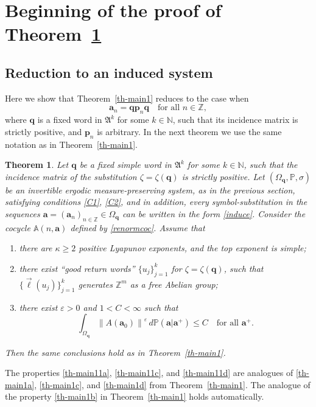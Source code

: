 \documentclass[10pt]{amsart}
\theoremstyle{plain}
\newtheorem{theorem}{Theorem}[section]
\theoremstyle{definition}
\newcommand\bom{{\boldsymbol a}}\let\ba\bom
\newcommand\bp{{\boldsymbol p}}
\newcommand\bq{{\boldsymbol q}}
\let\eps\varepsilon
\let\Om\Omega
\let\sig\sigma
\newcommand\FrA{\mathfrak{A}}
\newcommand\Aa{\mathbb{A}}
\newcommand{\Z}{\mathbb{Z}}
\newcommand{\N}{\mathbb{N}}
\renewcommand{\P}{\mathbb{P}}
\newcommand\be{\begin{equation}}
\newcommand\ee{\end{equation}}
\begin{document}
\section{Beginning of the proof of Theorem~\ref{th-main11}}\label{sec:4}
\subsection{Reduction to an induced system}

Here we show that Theorem~\ref{th-main1} reduces to the case when
\be \label{induce}
\bom_n = \bq \bp_n \bq\quad \text{for all }n\in \Z,
\ee
where $\bq$ is a fixed word in $\FrA^k$ for some $k\in \N$, such that its incidence matrix is strictly positive, and $\bp_n$ is arbitrary. In the next theorem we use the same notation as in Theorem~\ref{th-main1}.

\begin{theorem} \label{th-main11}
Let $\bq$ be a fixed simple word in $\FrA^k$ for some $k\in \N$, such that the incidence matrix of the substitution $\zeta = \zeta(\bq)$ is strictly positive.
Let $(\Om_\bq,\P,\sig)$ be an invertible ergodic measure-preserving system, as in the previous section, satisfying conditions \eqref{C1}, \eqref{C2}, and in addition, every symbol-substitution in the sequences $\ba=(\ba_n)_{n\in \Z} \in \Om_\bq$ can be written in the form \eqref{induce}.
Consider the cocycle $\Aa(n,\bom)$ defined by \eqref{renormcoc}. Assume that
\begin{enumerate}\renewcommand{\theenumi}{\alph{enumi}$'$}
\item\label{th-main11a}
there are $\kappa\ge 2$ positive Lyapunov exponents,
and the top exponent is simple;
\item\label{th-main11c}
there exist ``good return words'' $\{u_j\}_{j=1}^k$ for $\zeta=\zeta(\bq)$, such that $\{\vec{\ell}(u_j)\}_{j=1}^k$ generates $\Z^m$ as a free Abelian group;
\item\label{th-main11d}
there exist $\eps>0$ and $1<C<\infty$ such that
\be \label{eq-star11}
\int_{\Om_\bq} \left\|A(\bom_0)\right\|^\eps\,d\P(\bom|\bom^+) \le C\quad \text{for all }\bom^+.
\ee
\end{enumerate}
Then the same conclusions hold as in Theorem~\ref{th-main1}.
\end{theorem}

The properties \eqref{th-main11a}, \eqref{th-main11c}, and \eqref{th-main11d} are analogues of \eqref{th-main1a}, \eqref{th-main1c}, and \eqref{th-main1d} from Theorem~\ref{th-main1}. The analogue of the property \eqref{th-main1b} in Theorem~\ref{th-main1} holds automatically.
\end{document}

